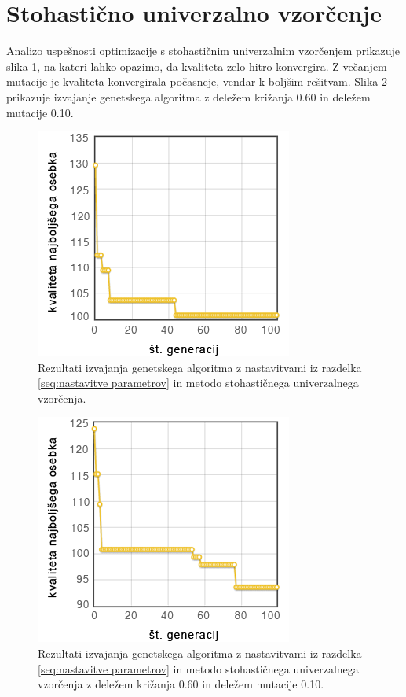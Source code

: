 \documentclass[a4paper, 12pt]{book}
\begin{document}
\section{Stohasti\v cno univerzalno vzor\v cenje}
Analizo uspe\v snosti optimizacije s stohasti\v cnim univerzalnim vzor\v cenjem prikazuje slika \ref{fig5}, na kateri lahko opazimo, da kvaliteta zelo hitro konvergira. Z ve\v canjem mutacije je kvaliteta konvergirala po\v casneje, vendar k bolj\v sim re\v sitvam. Slika \ref{stoh brez mutacije} prikazuje izvajanje genetskega algoritma z dele\v zem kri\v zanja 0.60 in dele\v zem mutacije 0.10.

\begin{figure}
\centering
\includegraphics[scale=0.70]{stoh_izbira.png}
\caption{Rezultati izvajanja genetskega algoritma z nastavitvami iz razdelka \ref{seq:nastavitve parametrov} in metodo stohasti\v cnega univerzalnega vzor\v cenja.}
\label{fig5}
\end{figure}

\begin{figure}
\centering
\includegraphics[scale=0.70]{stoh_brez_mut.png}
\caption{Rezultati izvajanja genetskega algoritma z nastavitvami iz razdelka \ref{seq:nastavitve parametrov} in metodo stohasti\v cnega univerzalnega vzor\v cenja z dele\v zem kri\v zanja 0.60 in dele\v zem mutacije 0.10.}
\label{stoh brez mutacije}
\end{figure}
\end{document}
